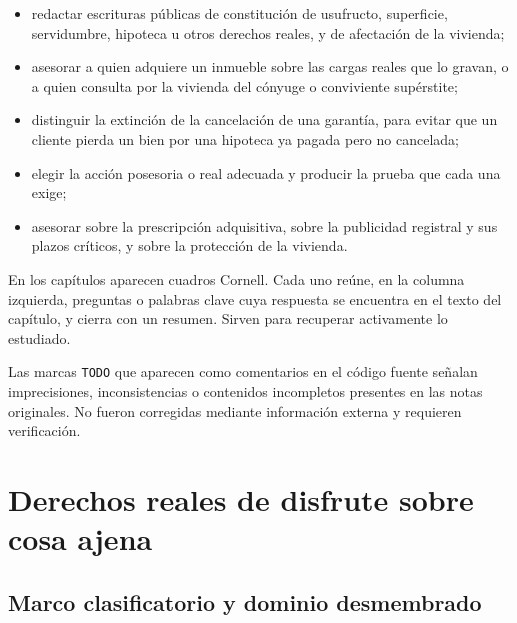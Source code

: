 \documentclass[12pt,oneside]{book}
\begin{document}
\begin{itemize}
    \item redactar escrituras públicas de constitución de usufructo, superficie, servidumbre, hipoteca u otros derechos reales, y de afectación de la vivienda;
    \item asesorar a quien adquiere un inmueble sobre las cargas reales que lo gravan, o a quien consulta por la vivienda del cónyuge o conviviente supérstite;
    \item distinguir la extinción de la cancelación de una garantía, para evitar que un cliente pierda un bien por una hipoteca ya pagada pero no cancelada;
    \item elegir la acción posesoria o real adecuada y producir la prueba que cada una exige;
    \item asesorar sobre la prescripción adquisitiva, sobre la publicidad registral y sus plazos críticos, y sobre la protección de la vivienda.
\end{itemize}

\begin{note}
En los capítulos aparecen cuadros Cornell. Cada uno reúne, en la columna izquierda, preguntas o palabras clave cuya respuesta se encuentra en el texto del capítulo, y cierra con un resumen. Sirven para recuperar activamente lo estudiado.
\end{note}

\begin{note}
Las marcas \texttt{TODO} que aparecen como comentarios en el código fuente señalan imprecisiones, inconsistencias o contenidos incompletos presentes en las notas originales. No fueron corregidas mediante información externa y requieren verificación.
\end{note}

\part{Derechos reales de disfrute sobre cosa ajena}

\chapter[Marco clasificatorio y dominio desmembrado]{Marco clasificatorio y dominio desmembrado}\label{cap:marco}
\end{document}
